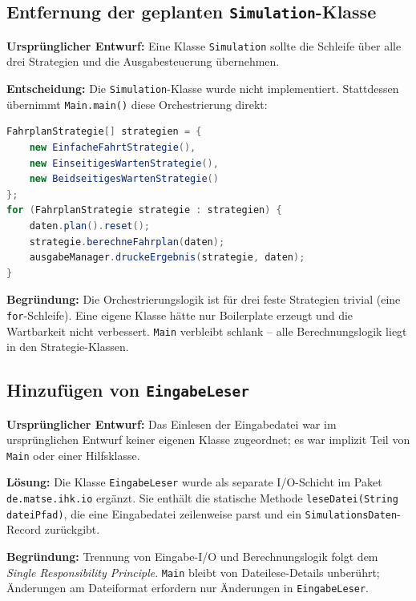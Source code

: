 \documentclass[12pt,a4paper]{article}
\begin{document}
\subsection{Entfernung der geplanten \texttt{Simulation}-Klasse}

\textbf{Ursprünglicher Entwurf:} Eine Klasse \texttt{Simulation} sollte die
Schleife über alle drei Strategien und die Ausgabesteuerung übernehmen.

\textbf{Entscheidung:} Die \texttt{Simulation}-Klasse wurde nicht implementiert.
Stattdessen übernimmt \texttt{Main.main()} diese Orchestrierung direkt:

\begin{lstlisting}[language=Java, caption={Orchestrierung in \texttt{Main.main()} statt \texttt{Simulation}-Klasse}]
FahrplanStrategie[] strategien = {
    new EinfacheFahrtStrategie(),
    new EinseitigesWartenStrategie(),
    new BeidseitigesWartenStrategie()
};
for (FahrplanStrategie strategie : strategien) {
    daten.plan().reset();
    strategie.berechneFahrplan(daten);
    ausgabeManager.druckeErgebnis(strategie, daten);
}
\end{lstlisting}

\textbf{Begründung:} Die Orchestrierungslogik ist für drei feste Strategien trivial
(eine \texttt{for}-Schleife). Eine eigene Klasse hätte nur Boilerplate erzeugt und die
Wartbarkeit nicht verbessert. \texttt{Main} verbleibt schlank – alle
Berechnungslogik liegt in den Strategie-Klassen.

\subsection{Hinzufügen von \texttt{EingabeLeser}}

\textbf{Ursprünglicher Entwurf:} Das Einlesen der Eingabedatei war im ursprünglichen
Entwurf keiner eigenen Klasse zugeordnet; es war implizit Teil von \texttt{Main}
oder einer Hilfsklasse.

\textbf{Lösung:} Die Klasse \texttt{EingabeLeser} wurde als separate I/O-Schicht im
Paket \texttt{de.matse.ihk.io} ergänzt. Sie enthält die statische Methode
\texttt{leseDatei(String dateiPfad)}, die eine Eingabedatei zeilenweise parst und
ein \texttt{SimulationsDaten}-Record zurückgibt.

\textbf{Begründung:} Trennung von Eingabe-I/O und Berechnungslogik folgt dem
\textit{Single Responsibility Principle}. \texttt{Main} bleibt von
Dateilese-Details unberührt; Änderungen am Dateiformat erfordern nur
Änderungen in \texttt{EingabeLeser}.
\end{document}

